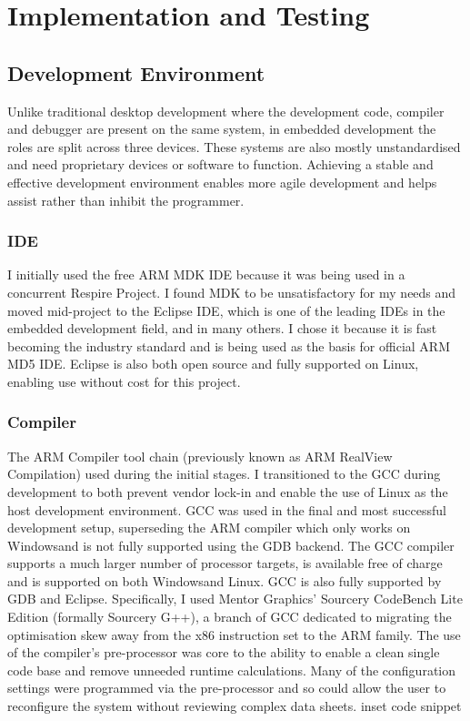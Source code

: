 
\chapter{Implementation and Testing}

\section{Development Environment}
Unlike traditional desktop development where the development code, compiler
and debugger are present on the same system, in embedded development the
roles are split across three devices. These systems are also mostly unstandardised
and need proprietary devices or software to function. Achieving a stable and
effective development environment enables more agile development and
helps assist rather than inhibit the programmer.

\subsection{\acf{IDE}}
I initially used the free ARM MDK IDE because it was being used in a concurrent Respire Project. I
found MDK to be unsatisfactory for my needs and moved mid-project to the Eclipse \ac{IDE}, which is
one of the leading \acp{IDE} in the embedded development field, and in many others. I chose it because it
is fast becoming the industry standard and is being used as the basis for official ARM MD5 IDE.
Eclipse is also both open source and fully supported on Linux, enabling use without cost for this
project.

\subsection{Compiler}
The ARM Compiler tool chain (previously known as ARM RealView Compilation) used during the
initial stages. I transitioned to the \ac{GCC} during development to both
prevent vendor lock-in and enable the use of Linux as the host development environment. \ac{GCC} was
used in the final and most successful development setup, superseding the ARM compiler which only
works on Windows\textregistered and is not fully supported using the \ac{GDB} backend. The \ac{GCC} compiler supports
a much larger number of processor targets, is available free of charge and is supported on both
Windows\textregistered and Linux. \ac{GCC} is also fully supported by \ac{GDB} and Eclipse. Specifically, I used Mentor
Graphics' Sourcery CodeBench Lite Edition (formally Sourcery G++), a branch of \ac{GCC} dedicated to
migrating the optimisation skew away from the x86 instruction set to the ARM family.
The use of the compiler's pre-processor was core to the ability to enable a clean single code base
and remove unneeded runtime calculations. Many of the configuration settings were programmed
via the pre-processor and so could allow the user to reconfigure the system without reviewing
complex data sheets.
{inset code snippet}


